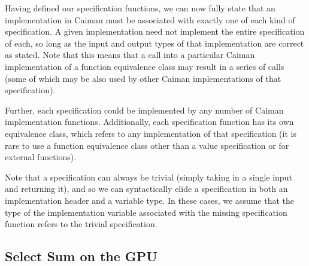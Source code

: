 Having defined our specification functions, we can now fully state that an implementation in Caiman must be associated with exactly one of each kind of specification.  A given implementation need not implement the entire specification of each, so long as the input and output types of that implementation are correct as stated.  Note that this means that a call into a particular Caiman implementation of a function equivalence class may result in a series of calls (some of which may be also used by other Caiman implementations of that specification).

Further, each specification could be implemented by any number of Caiman implementation functions.  Additionally, each specification function has its own equivalence class, which refers to any implementation of that specification (it is rare to use a function equivalence class other than a value specification or for external functions).

Note that a specification can always be trivial (simply taking in a single input and returning it), and so we can syntactically elide a specification in both an implementation header and a variable type.  In these cases, we assume that the type of the implementation variable associated with the missing specification function refers to the trivial specification.
\subsection{Select Sum on the GPU}
\label{subsec:fullexample}

